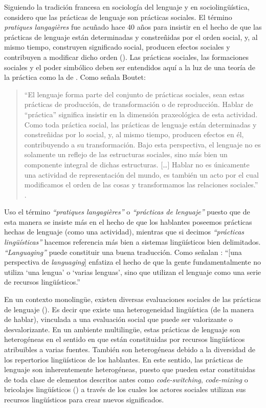 \documentclass[output=paper]{langscibook}
\begin{document}
Siguiendo la tradición francesa en sociología del lenguaje y en sociolingüística, considero que las prácticas de lenguaje son prácticas sociales. El término \textit{pratiques langagières} fue acuñado hace 40 años para insistir en el hecho de que las prácticas de lenguaje están determinadas y constreñidas por el orden social, y, al mismo tiempo, construyen significado social, producen efectos sociales y contribuyen a modificar dicho orden (\citealt{BoutetEtAl1976}). Las prácticas sociales, las formaciones sociales y el poder simbólico deben ser entendidos aquí a la luz de una teoría de la práctica como la de \citet{Bourdieu1977}. Como señala Boutet:

\begin{quote}
“El lenguaje forma parte del conjunto de prácticas sociales, sean estas prácticas de producción, de transformación o de reproducción. Hablar de “práctica” significa insistir en la dimensión praxeológica de esta actividad. Como toda práctica social, las prácticas de lenguaje están determinadas y constreñidas por lo social, y, al mismo tiempo, producen efectos en él, contribuyendo a su transformación. Bajo esta perspectiva, el lenguaje no es solamente un reflejo de las estructuras sociales, sino más bien un componente integral de dichas estructuras. […] Hablar no es únicamente una actividad de representación del mundo, es también un acto por el cual modificamos el orden de las cosas y transformamos las relaciones sociales.” \citep[459]{Boutet2002}.
\end{quote}

Uso el término \textit {“pratiques langagières”} o \textit {“prácticas de lenguaje”} puesto que de esta manera se insiste más en el hecho de que los hablantes poseemos prácticas hechas de lenguaje (como una actividad), mientras que si decimos \textit {“prácticas lingüísticas”} hacemos referencia más bien a sistemas lingüísticos bien delimitados. \textit {“Languaging”} puede constituir una buena traducción. Como señalan \citet[2]{JørgensenJuffermans2011}: “[una perspectiva de \textit {languaging}] enfatiza el hecho de que la gente fundamentalmente no utiliza ‘una lengua’ o ‘varias lenguas’, sino que utilizan el lenguaje como una serie de recursos lingüísticos.”

En un contexto monolingüe, existen diversas evaluaciones sociales de las prácticas de lenguaje (\citealt{Bakhtin1977,Boutet1982}). Es decir que existe una heterogeneidad lingüística (de la manera de hablar), vinculada a una evaluación social que puede ser valorizante o desvalorizante. En un ambiente multilingüe, estas prácticas de lenguaje son heterogéneas \citep{Léglise2013} en el sentido en que están constituidas por recursos lingüísticos atribuibles a varias fuentes. También son heterogéneas debido a la diversidad de los repertorios lingüísticos de los hablantes. En este sentido, las prácticas de lenguaje son inherentemente heterogéneas, puesto que pueden estar constituidas de toda clase de elementos descritos antes como \textit {code-switching}, \textit {code-mixing} o bricolajes lingüísticos (\citealt{Lüdi1994,Mondada2012}) a través de los cuales los actores sociales utilizan sus recursos lingüísticos para crear nuevos significados.
\end{document}
